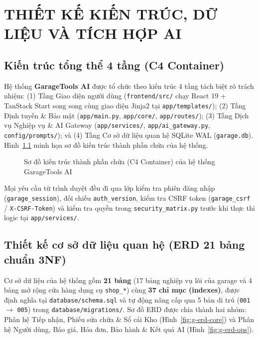 \chapter{THIẾT KẾ KIẾN TRÚC, DỮ LIỆU VÀ TÍCH HỢP AI}

\section{Kiến trúc tổng thể 4 tầng (C4 Container)}

Hệ thống \textbf{GarageTools AI} được tổ chức theo kiến trúc 4 tầng tách biệt rõ trách nhiệm: (1) Tầng Giao diện người dùng (\texttt{frontend/src/} chạy React 19 + TanStack Start song song cùng giao diện Jinja2 tại \texttt{app/templates/}); (2) Tầng Định tuyến \& Bảo mật (\texttt{app/main.py}, \texttt{app/core/}, \texttt{app/routes/}); (3) Tầng Dịch vụ Nghiệp vụ \& AI Gateway (\texttt{app/services/}, \texttt{app/ai\_gateway.py}, \texttt{config/prompts/}); và (4) Tầng Cơ sở dữ liệu quan hệ SQLite WAL (\texttt{garage.db}). Hình~\ref{fig:g-container} minh họa sơ đồ kiến trúc thành phần chứa của hệ thống.

\begin{figure}[H]
\centering
\vspace{2pt}

\vspace{2pt}
\caption{Sơ đồ kiến trúc thành phần chứa (C4 Container) của hệ thống GarageTools AI}
\label{fig:g-container}
\end{figure}

Mọi yêu cầu từ trình duyệt đều đi qua lớp kiểm tra phiên đăng nhập (\texttt{garage\_session}), đối chiếu \texttt{auth\_version}, kiểm tra CSRF token (\texttt{garage\_csrf} / \texttt{X-CSRF-Token}) và kiểm tra quyền trong \texttt{security\_matrix.py} trước khi thực thi logic tại \texttt{app/services/}.

\section{Thiết kế cơ sở dữ liệu quan hệ (ERD 21 bảng chuẩn 3NF)}

Cơ sở dữ liệu của hệ thống gồm \textbf{21 bảng} (17 bảng nghiệp vụ lõi của garage và 4 bảng mở rộng cửa hàng dụng cụ \texttt{shop\_*}) cùng \textbf{37 chỉ mục (indexes)}, được định nghĩa tại \texttt{database/schema.sql} và tự động nâng cấp qua 5 bản di trú (\texttt{001} $\rightarrow$ \texttt{005}) trong \texttt{database/migrations/}. Sơ đồ ERD được chia thành hai nhóm: Phân hệ Tiếp nhận, Phiếu sửa chữa \& Sổ cái Kho (Hình~\ref{fig:g-erd-core}) và Phân hệ Người dùng, Báo giá, Hóa đơn, Bảo hành \& Kết quả AI (Hình~\ref{fig:g-erd-ops}).

